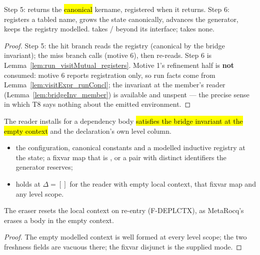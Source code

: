 \begin{lemma}
\label{lem:step5}
\leanok
{}
 Step 5:  returns the \hl{canonical} kername, registered
when it returns. Step 6:  registers a tabled name, grows the state canonically, advances
the generator, keeps the registry modelled.
  takes / beyond its interface; 
takes none.
\end{lemma}
\begin{proof}
\leanok
{}
 Step 5: the hit branch reads the registry (canonical by the bridge invariant); the miss
branch calls  (motive 6), then re-reads. Step 6 is
Lemma~\ref{lem:run_visitMutual_registers}. Motive 1's refinement half is \textbf{not} consumed: motive 6
reports registration only, so run facts come from Lemma~\ref{lem:visitExpr_runConcl}; the invariant at
the member's reader (Lemma~\ref{lem:bridgeInv_member}) is available and unspent --- the precise sense in
which T8 says nothing about the emitted environment.
\end{proof}

\begin{lemma}
\label{lem:bridgeInv_member}
\leanok
{}
 The reader  installs for a dependency body \hl{satisfies the bridge
invariant at the empty context} and the declaration's own level column.
\begin{itemize}
\item {} the configuration, canonical constants and a modelled inductive registry at the
state; a fixvar map that is , or a  pair with distinct identifiers the
generator reserves;
\item {}  holds at $\Delta = []$ for the reader with empty local context, that
fixvar map and any level scope.
\end{itemize}
 The eraser resets the local context on re-entry (F-DEPLCTX), as MetaRocq's
 erases a body in the empty context.
\end{lemma}
\begin{proof}
\leanok
{}
 The empty modelled context is well formed at every level scope; the two freshness fields are
vacuous there; the fixvar disjunct is the supplied mode.
\end{proof}

